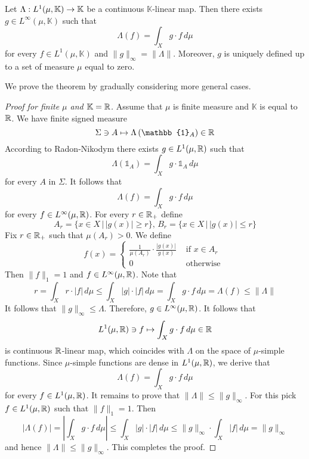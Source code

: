 \begin{theorem}\label{theorem:dual_to_L_1}
Let $\Lambda:L^{1}(\mu,\mathbb{K})\rightarrow \mathbb{K}$ be a continuous $\mathbb{K}$-linear map. Then there exists $g \in L^{\infty}(\mu,\mathbb{K})$ such that 
$$\Lambda(f) = \int_Xg\cdot f\,d\mu$$
for every $f \in L^1(\mu,\mathbb{K})$ and $\lVert g \rVert_{\infty} = \lVert \Lambda \rVert$. Moreover, $g$ is uniquely defined up to a set of measure $\mu$ equal to zero.
\end{theorem}
\noindent
We prove the theorem by gradually considering more general cases.

\begin{proof}[Proof for finite $\mu$ and $\mathbb{K}={\mathbb R}$]
Assume that $\mu$ is finite measure and $\mathbb{K}$ is equal to ${\mathbb R}$. We have finite signed measure
$$\Sigma \ni A \mapsto  \Lambda\left(\mathbb{1}_A\right) \in \RR$$
According to Radon-Nikodym there exists $g \in L^1(\mu,{\mathbb R})$ such that
$$\Lambda\left(\mathbb{1}_A\right) = \int_Xg\cdot \mathbb{1}_A\,d\mu$$
for every $A$ in $\Sigma$. It follows that
$$\Lambda(f) = \int_Xg\cdot f\,d\mu$$
for every $f \in L^{\infty}(\mu,{\mathbb R})$. For every $r \in {\mathbb R}_+$ define
$$A_r = \big\{x\in X\,\big|\,|g(x)|\geq r\big\},\,B_r = \big\{x\in X\,\big|\,|g(x)|\leq r\big\}$$
Fix $r\in {\mathbb R}_+$ such that $\mu(A_r) > 0$. We define
$$f(x) = \begin{cases}
  \frac{1}{\mu(A_r)}\cdot \frac{|g(x)|}{g(x)}&\mbox{ if }x\in A_r\\
  0&\mbox{ otherwise }
\end{cases}
$$
Then $\lVert f\rVert_1 = 1$ and $f \in L^{\infty}(\mu,{\mathbb R})$. Note that 
$$r = \int_X r\cdot |f|\,d\mu \leq \int_X |g|\cdot |f|\,d\mu =\int_X g \cdot  f\,d\mu = \Lambda(f) \leq \lVert \Lambda\rVert$$
It follows that $\lVert g \rVert_{\infty} \leq \Lambda$. Therefore, $g \in L^{\infty}(\mu,{\mathbb R})$. It follows that 
$$L^1(\mu,{\mathbb R}) \ni f \mapsto \int_{X}g\cdot f\,d\mu \in {\mathbb R}$$
is continuous ${\mathbb R}$-linear map, which coincides with $\Lambda$ on the space of $\mu$-simple functions. Since $\mu$-simple functions are dense in $L^1(\mu,{\mathbb R})$, we derive that
$$\Lambda(f) = \int_{X}g\cdot f\,d\mu$$
for every $f \in L^1(\mu,{\mathbb R})$. It remains to prove that $\lVert \Lambda \rVert \leq \lVert g\rVert_{\infty}$. For this pick $f \in L^1(\mu,{\mathbb R})$ such that $\lVert f \rVert_1 = 1$. Then
$$\left|\Lambda(f)\right| = \left|\int_X g\cdot f \,d\mu \right| \leq \int_X|g|\cdot |f|\,d\mu \leq \lVert g \rVert_{\infty}\cdot \int_X|f|\,d\mu = \lVert g \rVert_{\infty}$$
and hence $\lVert \Lambda \rVert \leq \lVert g\rVert_{\infty}$. This completes the proof.
\end{proof}

